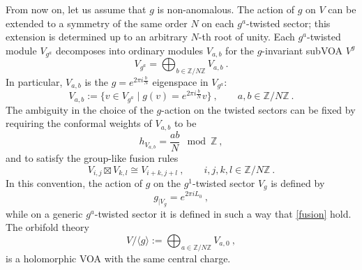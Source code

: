 \documentclass[11pt,reqno]{article}
\newcommand{\be}{\begin{equation}}
\newcommand{\ee}{\end{equation}}
\newcommand{\beq}{\begin{equation}}
\newcommand{\eeq}{\end{equation}}
\newcommand{\ZZ}{\mathbb{Z}}
\begin{document}
From now on, let us assume that $g$ is non-anomalous. The action of $g$ on $V$ can be extended to a symmetry of the same order $N$ on each $g^a$-twisted sector; this extension is determined up to an arbitrary $N$-th root of unity. Each ${g^a}$-twisted module $V_{g^a}$ decomposes into ordinary modules $V_{a,b}$ for the $g$-invariant subVOA $V^g$
\be V_{g^a}=\bigoplus_{b\in \ZZ/N\ZZ} V_{a,b}\ .
\ee
In particular, $V_{a,b}$ is the $g=e^{2\pi i\frac{b}{N}}$ eigenspace in $V_{g^a}$:
\be V_{a,b}:=\{ v\in V_{g^a}\mid g(v)=e^{2\pi i \frac{b}{N}}v\}\ ,\qquad a,b\in \ZZ/N\ZZ\ .
\ee
The ambiguity in the choice of the $g$-action on the twisted sectors can be fixed by requiring
the conformal weights of $V_{a,b}$ to be
\beq\label{weights} h_{V_{a,b}}=\frac{ab}{N}\mod \ZZ\ ,
\eeq
and to satisfy the group-like fusion rules
\beq\label{fusion} V_{i,j}\boxtimes V_{k,l}\cong  V_{i+k,j+l}\ , \qquad i,j,k,l\in \ZZ/N\ZZ\ .
\eeq
In this convention, the action of $g$ on the $g^1$-twisted sector $V_g$ is defined by
\be g_{\rvert V_{g}}=e^{2\pi i L_0}\ ,
\ee while on a generic $g^a$-twisted sector it is defined in such a way that \eqref{fusion} hold.
The orbifold theory 
\be
V/\langle g\rangle:=\bigoplus_{a\in \ZZ/N\ZZ} V_{a,0}\ ,
\ee is a holomorphic VOA with the same central charge.
\end{document}
